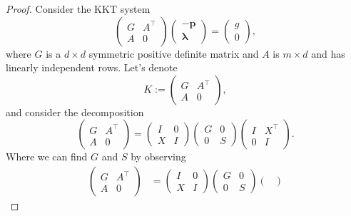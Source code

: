\documentclass[12pt]{report}
\begin{document}
\begin{problem}
\begin{proof}
Consider the KKT system 
\begin{equation*}
    \begin{pmatrix}
        G & A^\top\\ A & 0
    \end{pmatrix} \begin{pmatrix}
        -\mathbf{p} \\ \mathbf{\lambda}
    \end{pmatrix} = \begin{pmatrix}
        g \\ 0
    \end{pmatrix},
\end{equation*}
where $G$ is a $d\times d$ symmetric positive definite matrix and $A$ is $m\times d$ and has linearly independent rows. Let's denote
\begin{equation*}
    K := \begin{pmatrix}
        G & A^\top \\ A & 0
    \end{pmatrix},
\end{equation*}
and consider the decomposition
\begin{equation*}
    \begin{pmatrix}
        G & A^\top \\ A & 0
    \end{pmatrix} = \begin{pmatrix}
        I & 0 \\ X & I
    \end{pmatrix} \begin{pmatrix}
        G & 0 \\ 0 & S
    \end{pmatrix}\begin{pmatrix}
        I & X^\top\\ 0 & I
    \end{pmatrix}.
\end{equation*}
Where we can find $G$ and $S$ by observing
\begin{align*}
    \begin{pmatrix}
        G & A^\top \\ A & 0
    \end{pmatrix} &= \begin{pmatrix}
        I & 0 \\ X & I
    \end{pmatrix} \begin{pmatrix}
        G & 0 \\ 0 & S
    \end{pmatrix}\begin{pmatrix}

\end{pmatrix}
\end{align*}
\end{proof}
\end{problem}
\end{document}
